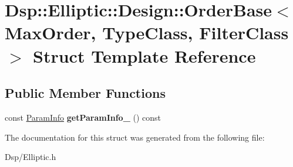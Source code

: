 \hypertarget{structDsp_1_1Elliptic_1_1Design_1_1OrderBase}{\section{Dsp\-:\-:Elliptic\-:\-:Design\-:\-:Order\-Base$<$ Max\-Order, Type\-Class, Filter\-Class $>$ Struct Template Reference}
\label{structDsp_1_1Elliptic_1_1Design_1_1OrderBase}
}
\subsection*{Public Member Functions}
\begin{DoxyCompactItemize}
\item 
\hypertarget{structDsp_1_1Elliptic_1_1Design_1_1OrderBase_a29ce71035855c267db0fe2e98c5f7944}{const \hyperlink{classDsp_1_1ParamInfo}{Param\-Info} {\bfseries get\-Param\-Info\-\_} () const }\label{structDsp_1_1Elliptic_1_1Design_1_1OrderBase_a29ce71035855c267db0fe2e98c5f7944}

\end{DoxyCompactItemize}


The documentation for this struct was generated from the following file\-:\begin{DoxyCompactItemize}
\item 
Dsp/Elliptic.\-h\end{DoxyCompactItemize}
